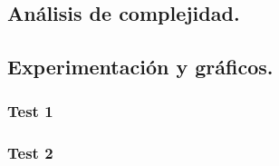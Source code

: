 \vspace*{0.6cm}






\subsection{Análisis de complejidad.}

\vspace*{0.3cm}


\vspace*{0.6cm}

\subsection{Experimentación y gráficos.}


\subsubsection{Test 1}

\vspace*{0.3cm}


\vspace*{0.6cm}

\subsubsection{Test 2}


\newpage